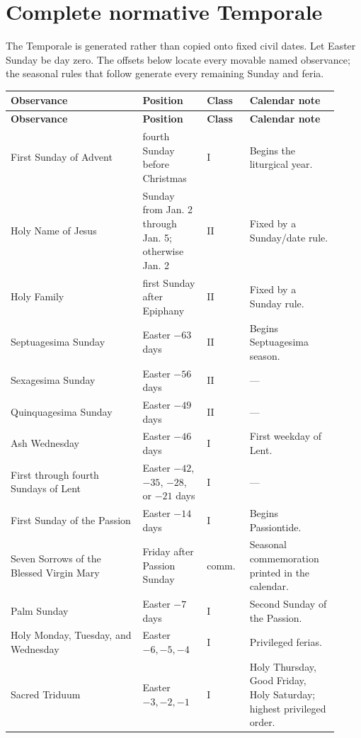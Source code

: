 \section{Complete normative Temporale}

The Temporale is generated rather than copied onto fixed civil dates. Let Easter Sunday be day zero. The offsets below locate every movable named observance; the seasonal rules that follow generate every remaining Sunday and feria.

\begin{longtable}{@{}>{\RaggedRight\arraybackslash}p{0.37\linewidth}>{\RaggedRight\arraybackslash}p{0.18\linewidth}>{\RaggedRight\arraybackslash}p{0.12\linewidth}>{\RaggedRight\arraybackslash}p{0.25\linewidth}@{}}
\toprule
\textbf{Observance} & \textbf{Position} & \textbf{Class} & \textbf{Calendar note}\\
\midrule
\endfirsthead
\toprule
\textbf{Observance} & \textbf{Position} & \textbf{Class} & \textbf{Calendar note}\\
\midrule
\endhead
\bottomrule
\endfoot
First Sunday of Advent & fourth Sunday before Christmas & I & Begins the liturgical year.\\
Holy Name of Jesus & Sunday from Jan. 2 through Jan. 5; otherwise Jan. 2 & II & Fixed by a Sunday/date rule.\\
Holy Family & first Sunday after Epiphany & II & Fixed by a Sunday rule.\\
Septuagesima Sunday & Easter $-63$ days & II & Begins Septuagesima season.\\
Sexagesima Sunday & Easter $-56$ days & II & ---\\
Quinquagesima Sunday & Easter $-49$ days & II & ---\\
Ash Wednesday & Easter $-46$ days & I & First weekday of Lent.\\
First through fourth Sundays of Lent & Easter $-42$, $-35$, $-28$, or $-21$ days & I & ---\\
First Sunday of the Passion & Easter $-14$ days & I & Begins Passiontide.\\
Seven Sorrows of the Blessed Virgin Mary & Friday after Passion Sunday & comm. & Seasonal commemoration printed in the calendar.\\
Palm Sunday & Easter $-7$ days & I & Second Sunday of the Passion.\\
Holy Monday, Tuesday, and Wednesday & Easter $-6,-5,-4$ & I & Privileged ferias.\\
Sacred Triduum & Easter $-3,-2,-1$ & I & Holy Thursday, Good Friday, Holy Saturday; highest privileged order.\\

\end{longtable}

